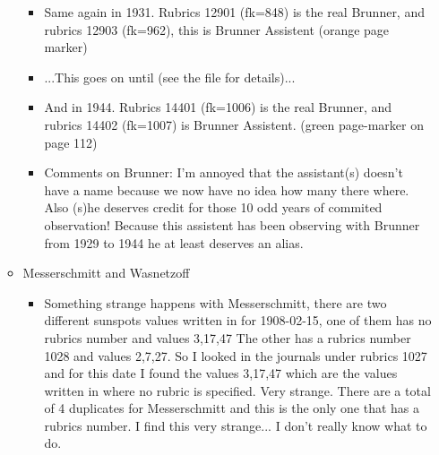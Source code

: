 \documentclass[12pt]{article}
\begin{document}
\begin{itemize}
\begin{itemize}
\begin{itemize}
        \item Same again in 1931. Rubrics 12901 (fk=848) is the real Brunner, and rubrics 12903 (fk=962), this is Brunner Assistent (orange page marker)
        \item ...This goes on until (see the file for details)...
        \item And in 1944. Rubrics 14401 (fk=1006) is the real Brunner, and rubrics 14402 (fk=1007) is Brunner Assistent. (green page-marker on page 112)
        \item Comments on Brunner: I'm annoyed that the assistant(s) doesn't have a name because we now have no idea how many there where. Also (s)he deserves credit for those 10 odd years of commited observation! Because this assistent has been observing with Brunner from 1929 to 1944 he at least deserves an alias. 
    \end{itemize}
    \item Messerschmitt and Wasnetzoff
    \begin{itemize}
        \item Something strange happens with Messerschmitt, there are two different sunspots values written in for 1908-02-15, one of them has no rubrics number and values 3,17,47 The other has a rubrics number 1028 and values 2,7,27. So I looked in the journals under rubrics 1027 and for this date I found the values 3,17,47 which are the values written in where no rubric is specified. Very strange. There are a total of 4 duplicates for Messerschmitt and this is the only one that has a rubrics number. I find this very strange... I don't really know what to do. 
    \end{itemize}
    \end{itemize}
    

\end{itemize}
\end{document}
